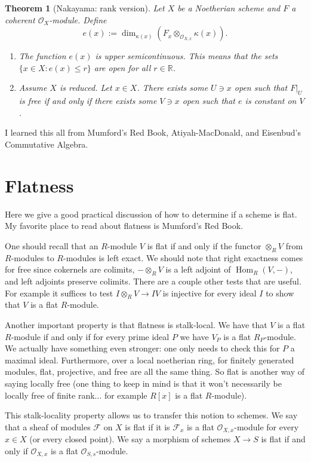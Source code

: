 \documentclass[12pt]{article}
\numberwithin{equation}{section}
\newtheorem{theorem}{Theorem}[subsection]
\theoremstyle{definition}
\theoremstyle{remark}
\newcommand{\RR}{\mathbb{R}}
\newcommand{\Hom}{\operatorname{Hom}}
\newcommand{\Ocal}{\mathcal{O}}
\newcommand{\Fcal}{\mathcal{F}}
\begin{document}
\begin{theorem}[Nakayama: rank version]\label{thm:nakayama-rank}
	Let $X$ be a Noetherian scheme and $F$ a coherent $\Ocal_X$-module.
	Define 
	$$ e(x) := \dim_{\kappa(x)}\left( F_x \otimes_{\Ocal_{X,x}} \kappa(x) \right). $$
	\begin{enumerate}
		\item 	The function $e(x)$ is upper semicontinuous. 
		This means that the sets $ \lbrace x \in X \colon e(x)\leq r \rbrace$
		are open for all $r\in \RR$.
		\item Assume $X$ is reduced. 
		Let $x\in X$. 
		There exists some $U\owns x$ open such that $F\vert_U$ is free if and only if there exists some $V \owns x$ open such that $e$ is constant on $V$.
	\end{enumerate}
\end{theorem}
I learned this all from Mumford's Red Book, Atiyah-MacDonald, and Eisenbud's Commutative Algebra.


\section{Flatness}
Here we give a good practical discussion of how to determine if a scheme is flat. 
My favorite place to read about flatness is Mumford's Red Book.

One should recall that an $R$-module $V$ is flat if and only if the functor $\otimes_RV$ from $R$-modules to $R$-modules is left exact. 
We should note that right exactness comes for free since cokernels are colimits, $-\otimes_R V$ is a left adjoint of $\Hom_R(V,-)$, and left adjoints preserve colimits. 
There are a couple other tests that are useful. 
For example it suffices to test $I\otimes_R V \to IV$ is injective for every ideal $I$ to show that $V$ is a flat $R$-module. 

Another important property is that flatness is stalk-local.
We have that $V$ is a flat $R$-module if and only if for every prime ideal $P$ we have $V_P$ is a flat $R_P$-module. 
We actually have something even stronger: one only needs to check this for $P$ a maximal ideal.
Furthermore, over a local noetherian ring, for finitely generated modules, flat, projective, and free are all the same thing.
So flat is another way of saying locally free (one thing to keep in mind is that it won't necessarily be locally free of finite rank... for example $R[x]$ is a flat $R$-module). 

This stalk-locality property allows us to transfer this notion to schemes. 
We say that a sheaf of modules $\Fcal$ on $X$ is flat if it is $\Fcal_x$ is a flat $\Ocal_{X,x}$-module for every $x\in X$ (or every closed point). 
We say a morphism of schemes $X \to S$ is flat if and only if $\Ocal_{X,x}$ is a flat $\Ocal_{S,s}$-module. 
\end{document}
